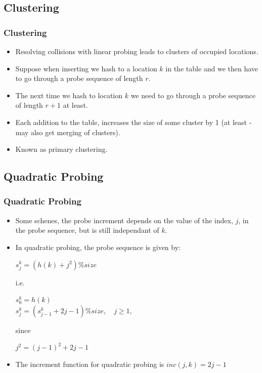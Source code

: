 \documentclass{beamer}
\begin{document}
\subsection{Clustering}
\begin{frame}
\frametitle{Clustering}
\begin{itemize}
\item Resolving collisions with linear probing leads to clusters of occupied locations.
\item Suppose when inserting we hash to a location $k$ in the table and we then have to go through a probe sequence of length $r$.
\item The next time we hash to location $k$ we need to go through a probe sequence of length $r+1$ at least.
\item Each addition to the table, increases the size of some cluster by 1 (at least - may also get merging of clusters).
\item Known as {\color{green}primary clustering}.
\end{itemize}
\end{frame}
\subsection{Quadratic Probing}
\begin{frame}[allowframebreaks]
\frametitle{Quadratic Probing}
\begin{itemize}
\item Some schenes, the probe increment depends on the value of the index, $j$, in the probe sequence, but is still independant of $k$.
\item In quadratic probing, the probe sequence is given by:\\
\begin{center}
$s_j^k = (h(k)+j^2)\%size$\\
\end{center}
i.e.\\
\begin{center}
$s_0^k = h(k)$\\
$s^k_j = (s^k_{j-1} + 2j - 1)\%size, \quad j \geq 1,$\\
\end{center}
since\\
\begin{center}
$j^2 = (j-1)^2+2j-1$
\end{center}
\item The increment function for quadratic probing is $inc(j,k) = 2j-1$
\end{itemize}
\qp
\end{frame}
\end{document}
